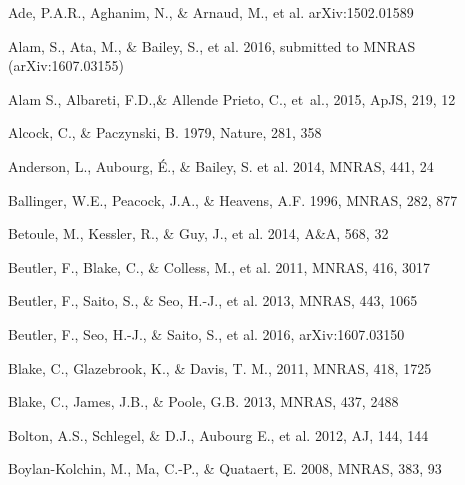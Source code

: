 \documentclass[useAMS,usenatbib]{mnras}
\begin{document}
\begin{thebibliography}{}


Ade, P.A.R., Aghanim, N., \& Arnaud, M., et al. arXiv:1502.01589

Alam, S., Ata, M., \& Bailey, S., et al. 2016,
submitted to MNRAS (arXiv:1607.03155)

{Alam} S., Albareti, F.D.,\& Allende Prieto, C., {et~al.}, 2015,  ApJS, 219, 12

Alcock, C., \& Paczynski, B. 1979, Nature, 281, 358  


Anderson, L., Aubourg, \'E., \& Bailey, S. et al. 2014, MNRAS, 441, 24  
  

Ballinger, W.E., Peacock, J.A., \& Heavens, A.F. 1996, MNRAS, 282, 877  

Betoule, M., Kessler, R., \& Guy, J., et al. 2014, A\&A, 568, 32


Beutler, F., Blake, C., \& Colless, M., et al. 2011, MNRAS, 416, 3017

Beutler, F., Saito, S., \& Seo, H.-J., et al. 2013, MNRAS, 443, 1065

Beutler, F., Seo, H.-J., \& Saito, S., et al. 2016,
arXiv:1607.03150

Blake, C., Glazebrook, K., \& Davis, T. M., 2011, MNRAS, 418, 1725  

Blake, C., James, J.B., \& Poole, G.B. 2013, MNRAS, 437, 2488

Bolton, A.S., Schlegel, \& D.J., Aubourg E., et al. 2012, AJ, 144, 144

Boylan-Kolchin, M., Ma, C.-P., \& Quataert, E. 2008, MNRAS, 383, 93



\end{thebibliography}
\end{document}
